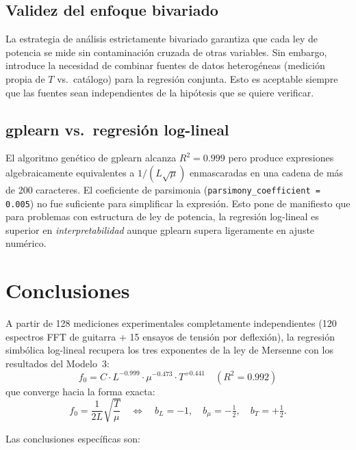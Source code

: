 \documentclass[12pt,a4paper]{article}
\begin{document}
\subsection{Validez del enfoque bivariado}

La estrategia de análisis estrictamente bivariado garantiza que cada ley
de potencia se mide sin contaminación cruzada de otras variables.
Sin embargo, introduce la necesidad de combinar fuentes de datos
heterogéneas (medición propia de $T$ vs.\ catálogo) para la regresión
conjunta. Esto es aceptable siempre que las fuentes sean independientes
de la hipótesis que se quiere verificar.

\subsection{gplearn vs.\ regresión log-lineal}

El algoritmo genético de gplearn alcanza $R^2 = 0.999$ pero produce
expresiones algebraicamente equivalentes a $1/(L\sqrt{\mu})$ enmascaradas
en una cadena de más de 200 caracteres. El coeficiente de parsimonia
(\texttt{parsimony\_coefficient = 0.005}) no fue suficiente para simplificar
la expresión. Esto pone de manifiesto que para problemas con estructura de
ley de potencia, la regresión log-lineal es superior en \emph{interpretabilidad}
aunque gplearn supera ligeramente en ajuste numérico.

\section{Conclusiones}

\begin{mersennebox}
  A partir de 128 mediciones experimentales completamente independientes
  (120 espectros FFT de guitarra + 15 ensayos de tensión por deflexión),
  la regresión simbólica log-lineal recupera los tres exponentes de la
  ley de Mersenne con los resultados del Modelo~3:
  \[
    f_0 = C \cdot L^{-0.999} \cdot \mu^{-0.473} \cdot T^{+0.441}
    \quad (R^2 = 0.992)
  \]
  que converge hacia la forma exacta:
  \[
    f_0 = \frac{1}{2L}\sqrt{\frac{T}{\mu}}
    \quad\Longleftrightarrow\quad
    b_L = -1,\quad b_\mu = -\tfrac{1}{2},\quad b_T = +\tfrac{1}{2}.
  \]
\end{mersennebox}

\medskip
Las conclusiones específicas son:
\end{document}
